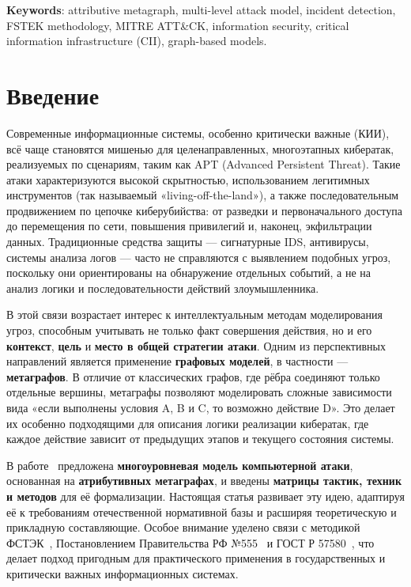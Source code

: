 \documentclass[12pt,a4paper]{article}
\begin{document}
\noindent\textbf{Keywords}: attributive metagraph, multi-level attack model, incident detection, FSTEK methodology, MITRE ATT\&CK, information security, critical information infrastructure (CII), graph-based models.


\section*{Введение}

Современные информационные системы, особенно критически важные (КИИ), всё чаще становятся мишенью для целенаправленных, многоэтапных кибератак, реализуемых по сценариям, таким как APT (Advanced Persistent Threat). Такие атаки характеризуются высокой скрытностью, использованием легитимных инструментов (так называемый «living-off-the-land»), а также последовательным продвижением по цепочке киберубийства: от разведки и первоначального доступа до перемещения по сети, повышения привилегий и, наконец, экфильтрации данных. Традиционные средства защиты — сигнатурные IDS, антивирусы, системы анализа логов — часто не справляются с выявлением подобных угроз, поскольку они ориентированы на обнаружение отдельных событий, а не на анализ логики и последовательности действий злоумышленника.

В этой связи возрастает интерес к интеллектуальным методам моделирования угроз, способным учитывать не только факт совершения действия, но и его \textbf{контекст}, \textbf{цель} и \textbf{место в общей стратегии атаки}. Одним из перспективных направлений является применение \textbf{графовых моделей}, в частности — \textbf{метаграфов}. В отличие от классических графов, где рёбра соединяют только отдельные вершины, метаграфы позволяют моделировать сложные зависимости вида «если выполнены условия A, B и C, то возможно действие D». Это делает их особенно подходящими для описания логики реализации кибератак, где каждое действие зависит от предыдущих этапов и текущего состояния системы.

В работе~\cite{latypov2020} предложена \textbf{многоуровневая модель компьютерной атаки}, основанная на \textbf{атрибутивных метаграфах}, и введены \textbf{матрицы тактик, техник и методов} для её формализации. Настоящая статья развивает эту идею, адаптируя её к требованиям отечественной нормативной базы и расширяя теоретическую и прикладную составляющие. Особое внимание уделено связи с методикой ФСТЭК~\cite{fsteck2015}, Постановлением Правительства РФ №555~\cite{post555} и ГОСТ Р 57580~\cite{gost57580}, что делает подход пригодным для практического применения в государственных и критически важных информационных системах.
\end{document}
